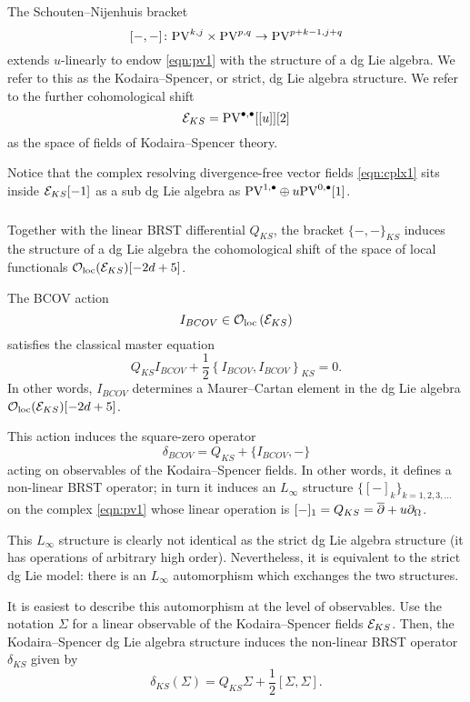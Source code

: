 \documentclass[11pt]{amsart}
\begin{document}
The Schouten--Nijenhuis bracket 
\[
[-,-] \colon {\rm PV}^{k,j} \times {\rm PV}^{p,q} \to {\rm PV}^{p+k-1,j+q} 
\]
extends $u$-linearly to endow \eqref{eqn:pv1} with the structure of a dg Lie algebra.
We refer to this as the Kodaira--Spencer, or strict, dg Lie algebra structure.
We refer to the further cohomological shift 
\[
\mathcal E_{KS} = {\rm PV}^{\bullet,\bullet} [[u]] [2]
\]
as the space of fields of Kodaira--Spencer theory.

Notice that the complex resolving divergence-free vector fields \eqref{eqn:cplx1} sits inside $\mathcal E_{KS} [-1]$ as a sub dg Lie algebra as ${\rm PV}^{1,\bullet} \oplus u {\rm PV}^{0,\bullet}[1]$. 

\subsubsection{}


\subsubsection{}

Together with the linear BRST differential $Q_{KS}$, the bracket $\{-,-\}_{KS}$ induces the structure of a dg Lie algebra the cohomological shift of the space of local functionals ${\mathcal O}_{\rm loc}(\mathcal E_{KS})[-2d+5]$. 

\begin{thm}
The BCOV action 
\[
I_{BCOV} \in {\mathcal O}_{\rm loc} \left(\mathcal E_{KS} \right) 
\]
satisfies the classical master equation 
\[
Q_{KS} I_{BCOV} + \frac12 \left\{I_{BCOV}, I_{BCOV}\right\}_{KS} = 0 .
\]
In other words, $I_{BCOV}$ determines a Maurer--Cartan element in the dg Lie algebra ${\mathcal O}_{\rm loc}(\mathcal E_{KS})[-2d+5]$.
\end{thm}

This action induces the square-zero operator 
\[
\delta_{BCOV} = Q_{KS} + \{I_{BCOV}, -\} 
\]
acting on observables of the Kodaira--Spencer fields. 
In other words, it defines a non-linear BRST operator; in turn it
induces an $L_\infty$ structure $\{[-]_k\}_{k =1,2,3,\ldots}$ on the complex \eqref{eqn:pv1} whose linear operation is $[-]_1 = Q_{KS} = \overline{\partial} + u\partial_{\Omega}$. 

This $L_\infty$ structure is clearly not identical as the strict dg Lie algebra structure (it has operations of arbitrary high order). 
Nevertheless, it is equivalent to the strict dg Lie model: there is an $L_\infty$ automorphism which exchanges the two structures.

It is easiest to describe this automorphism at the level of observables.
Use the notation $\Sigma$ for a linear observable of the Kodaira--Spencer fields $\mathcal E_{KS}$. 
Then, the Kodaira--Spencer dg Lie algebra structure induces the non-linear BRST operator $\delta_{KS}$ given by
\[
\delta_{KS} (\Sigma) = Q_{KS} \Sigma + \frac12 [\Sigma,\Sigma] .
\]
\end{document}
